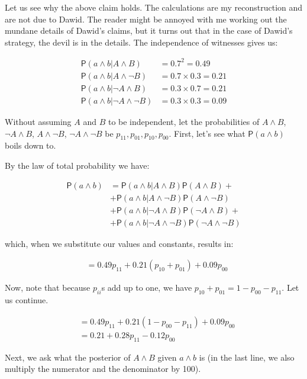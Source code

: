 \documentclass[10pt,dvipsnames,enabledeprecatedfontcommands]{scrartcl}
\newcommand{\n}{\neg}
\newcommand{\et}{\wedge}
\newcommand{\pr}[1]{\mathsf{P}(#1)}
\begin{document}
Let us see why the above claim holds. The calculations are my
reconstruction and are not due to Dawid. The reader might be annoyed
with me working out the mundane details of Dawid's claims, but it turns
out that in the case of Dawid's strategy, the devil is in the details.
The independence of witnesses gives us:

\begin{align*}
 \pr{a \et b \vert A\et B}& =0.7^2=0.49\\
 \pr{a \et b \vert A\et \n B}& =  0.7\times 0.3=0.21\\
 \pr{a \et b \vert \n A\et B}& =  0.3\times 0.7=0.21\\
 \pr{a \et b \vert \n A\et \n B}& =  0.3\times 0.3=0.09
 \end{align*}

Without assuming \(A\) and \(B\) to be independent, let the
probabilities of \(A\et B\), \(\n A\et B\), \(A\et \n B\),
\(\n A\et \n B\) be \(p_{11}, p_{01}, p_{10}, p_{00}\). First, let's see
what \(\pr{a\et b}\) boils down to.

By the law of total probability we have:

\begin{align}\label{eq:total_lower}
 \pr{a\et b} & = 
                     \pr{a\et b \vert A \et B}\pr{A\et B} + \\ &  \nonumber
                     +\pr{a\et b \vert A \et \n B}\pr{A\et \n B} \\ &  \nonumber
 + \pr{a\et b \vert \n A \et B}\pr{\n A\et B} + \\ & \nonumber
                     + \pr{a\et b \vert \n A \et \n B}\pr{\n A\et \n B}
 \end{align}

\noindent which, when we substitute our values and constants, results
in:

\begin{align*}
                     & = 0.49p_{11}+0.21(p_{10}+p_{01})+0.09p_{00}
 \end{align*}

Now, note that because \(p_{ii}\)s add up to one, we have
\(p_{10}+p_{01}=1-p_{00}-p_{11}\). Let us continue.

\begin{align*}
    & = 0.49p_{11}+0.21(1-p_{00}-p_{11})+0.09p_{00} \\
                     & = 0.21+0.28p_{11}-0.12p_{00}
 \end{align*}

Next, we ask what the posterior of \(A\et B\) given \(a\et b\) is (in
the last line, we also multiply the numerator and the denominator by
100).
\end{document}
